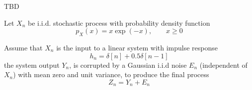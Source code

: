 \ifspanish

TBD

\else

Let $X_n$ be i.i.d. stochastic process with probability density function
\[
p_{X}(x) = x \exp(-x), \qquad x \ge 0
\]

Assume that $X_n$ is the input to a linear system with impulse response
\[
h_n = \delta[n] + 0.5 \delta[n-1]
\]
the system output $Y_n$, is corrupted by a Gaussian i.i.d noise $E_n$ (independent of $X_n$) with mean zero and unit variance, to produce the final process
\[
Z_n =  Y_n + E_n
\]


